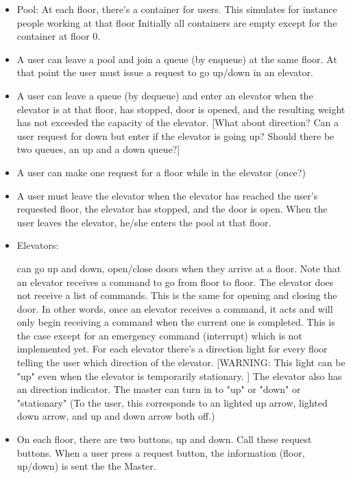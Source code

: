 \begin{itemize}
  \item Pool: At each floor, there's a container for users.
  This simulates for instance people working at that floor
  Initially all containers are empty except for the container at floor 0.
  
  \item A user can leave a pool and join a queue (by enqueue) at the same
  floor. At that point the user must issue a request to go up/down in an
  elevator.
  \item A user can leave a queue (by dequeue) and enter an elevator when the
  elevator is at that floor, has stopped, door is opened, and the
  resulting weight has not exceeded the capacity of the elevator.
  [What about direction? Can a user request for down but enter if the
  elevator is going up? Should there be two queues, an up and a down queue?]
  \item A user can make one request for a floor while in the elevator (once?)
  \item A user must leave the elevator when the elevator has reached the
  user's requested floor, the elevator has stopped, and the door is open.
  When the user leaves the elevator, he/she enters the pool at that floor.
  
  \item Elevators:
  \begin{tightlist}
    \li can go up and down, open/close doors when they arrive at a
    floor.
    \li Note that an elevator receives a command to go from floor to floor.
    The elevator does not receive a list of commands.
    \li This is the same for opening and closing the door.
    \li In other words, once an elevator receives a command, it acts and
    will only begin receiving a command when the current one is completed.
    This is the case except for an emergency command (interrupt)
    which is not implemented yet.
    \li For each elevator there's a direction light for every floor telling
    the user which direction of the elevator.
    [WARNING: This light can be "up" even when the elevator is temporarily
    stationary. ]
    \li The elevator also has an direction indicator. The master
    can turn in to "up" or "down" or "stationary"
    (To the user, this corresponds to an lighted up arrow, lighted down
    arrow, and up and down arrow both off.)
  \end{tightlist}
  
  \item On each floor, there are two buttons, up and down. Call these
  request buttons.
  When a user press a request button, the information (floor, up/down) is
  sent the the Master.
  

\end{itemize}
